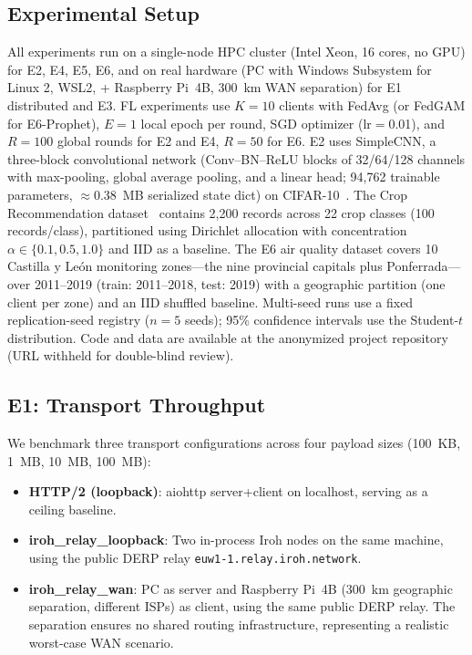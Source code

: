 \documentclass[a4paper,fleqn]{cas-dc}
\begin{document}
\subsection{Experimental Setup}

All experiments run on a single-node HPC cluster (Intel Xeon, 16 cores, no GPU) for E2, E4, E5, E6, and on real hardware (PC with Windows Subsystem for Linux 2, WSL2, + Raspberry Pi~4B, 300~km WAN separation) for E1 distributed and E3. FL experiments use $K{=}10$ clients with FedAvg (or FedGAM for E6-Prophet), $E{=}1$ local epoch per round, SGD optimizer (lr$=$0.01), and $R{=}100$ global rounds for E2 and E4, $R{=}50$ for E6. E2 uses SimpleCNN, a three-block convolutional network (Conv--BN--ReLU blocks of 32/64/128 channels with max-pooling, global average pooling, and a linear head; 94{,}762 trainable parameters, $\approx$0.38~MB serialized state dict) on CIFAR-10~\cite{cifar2009}. The Crop Recommendation dataset~\cite{cropdataset} contains 2,200 records across 22 crop classes (100 records/class), partitioned using Dirichlet allocation with concentration $\alpha \in \{0.1, 0.5, 1.0\}$ and IID as a baseline. The E6 air quality dataset covers 10 Castilla y Le\'on monitoring zones---the nine provincial capitals plus Ponferrada---over 2011--2019 (train: 2011--2018, test: 2019) with a geographic partition (one client per zone) and an IID shuffled baseline. Multi-seed runs use a fixed replication-seed registry ($n{=}5$ seeds); 95\% confidence intervals use the Student-$t$ distribution. Code and data are available at the anonymized project repository (URL withheld for double-blind review).

\subsection{E1: Transport Throughput}
\label{sec:e1}

We benchmark three transport configurations across four payload sizes (100~KB, 1~MB, 10~MB, 100~MB):

\begin{itemize}
    \item \textbf{HTTP/2 (loopback)}: aiohttp server+client on localhost, serving as a ceiling baseline.
    \item \textbf{iroh\_relay\_loopback}: Two in-process Iroh nodes on the same machine, using the public DERP relay \texttt{euw1-1.relay.iroh.network}.
    \item \textbf{iroh\_relay\_wan}: PC as server and Raspberry Pi~4B (300~km geographic separation, different ISPs) as client, using the same public DERP relay. The separation ensures no shared routing infrastructure, representing a realistic worst-case WAN scenario.
\end{itemize}
\end{document}
